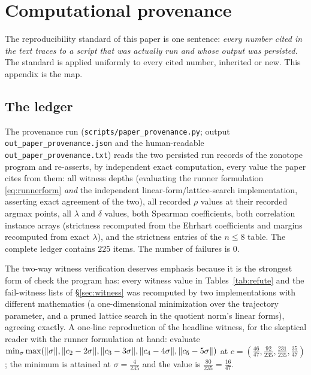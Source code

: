 
\section{Computational provenance}\label{sec:prov}

The reproducibility standard of this paper is one sentence:
\emph{every number cited in the text traces to a script that was
actually run and whose output was persisted.} The standard is applied
uniformly to every cited number, inherited or new. This appendix is
the map.

\subsection{The ledger}

The provenance run (\texttt{scripts/paper\_provenance.py}; output
\texttt{out\_paper\_provenance.json} and the human-readable
\texttt{out\_paper\_provenance.txt}) reads the two persisted run records
of the zonotope program and re-asserts, by independent exact
computation, every value the paper cites from them: all witness depths
(evaluating the runner formulation \eqref{eq:runnerform} \emph{and} the
independent linear-form/lattice-search implementation, asserting exact
agreement of the two), all recorded $\rho$ values at their recorded
argmax points, all $\lambda$ and $\delta$ values, both Spearman
coefficients, both correlation instance arrays (strictness recomputed
from the Ehrhart coefficients and margins recomputed from exact
$\lambda$), and the strictness entries of the $n\le8$ table. The
complete ledger contains $225$ items. The number of failures is $0$.

The two-way witness verification deserves emphasis because it is the
strongest form of check the program has: every witness value in
Tables~\ref{tab:refute} and the fail-witness lists of
\S\ref{sec:witness} was recomputed by two implementations with different
mathematics (a one-dimensional minimization over the trajectory
parameter, and a pruned lattice search in the quotient norm's linear
forms), agreeing exactly. A one-line reproduction of the headline
witness, for the skeptical reader with the runner formulation at
hand: evaluate
$\min_\sigma\max(\lVert \sigma \rVert,\lVert c_2-2\sigma \rVert,\lVert c_3-3\sigma \rVert,
\lVert c_4-4\sigma \rVert,\lVert c_5-5\sigma \rVert)$ at
$c=(\tfrac{46}{47},\tfrac{92}{235},\tfrac{231}{235},\tfrac{35}{47})$;
the minimum is attained at $\sigma=\tfrac{4}{235}$ and the value is
$\tfrac{80}{235}=\tfrac{16}{47}$.

